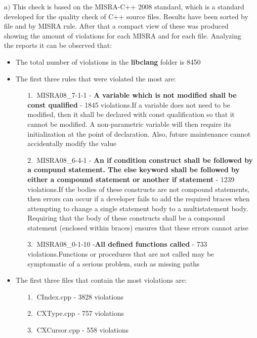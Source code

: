 \hspace{-0.6cm} \textbf{$a)$}  
This check is based on the MISRA-C++ 2008 standard, which is a standard developed for the quality check of C++ source files.\newline
Results have been sorted by file and by MISRA rule. After that a compact view of these was produced showing the amount of violations for each MISRA and for each file.\newline
Analyzing the reports it can be observed that:
\begin{itemize}
	\item The total number of violations in the \textbf{libclang} folder is 8450
	\item The first three rules that were violated the most are:
	\begin{itemize}
		\item[$1.\:$] MISRA08\_7-1-1 - \textbf{A variable which is not modified shall be const qualified} - 1845 violations.\newline If a variable does not need to be modified, then it shall be declared with const qualification so that it cannot be modified. A non-parametric variable will then require its initialization at the point of declaration. Also, future maintenance cannot accidentally modify the value
		\item[$2.\:$] MISRA08\_6-4-1 - \textbf{An if condition construct shall be followed by a compund statement. The else keyword shall be followed by either a compound statement or another if statement} - 1239 violations.\newline If the bodies of these constructs are not compound statements, then errors can occur if a developer fails to add the required braces when attempting to change a single statement body to a multistatement body. Requiring that the body of these constructs shall be a compound statement (enclosed within braces) ensures that these errors cannot arise
		\item[$3.\:$] MISRA08\_0-1-10 -\textbf{All defined functions called} - 733 violations.\newline Functions or procedures that are not called may be symptomatic of a serious problem, such as missing paths
	\end{itemize}
	\item The first three files that contain the most violations are:
		\begin{itemize}
		\item[$1.\:$] CIndex.cpp - 3828 violations
		\item[$2.\:$] CXType.cpp - 757 violations
		\item[$3.\:$] CXCursor.cpp - 558 violations
	\end{itemize}
\end{itemize}

